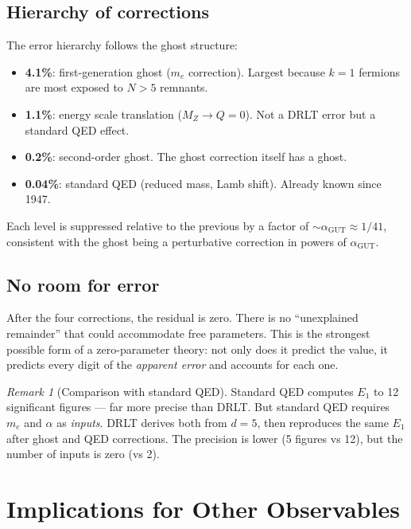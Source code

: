 \documentclass[12pt]{article}
\theoremstyle{remark}
\newtheorem{remark}[theorem]{Remark}
\begin{document}
\subsection{Hierarchy of corrections}

The error hierarchy follows the ghost structure:
\begin{itemize}
\item \textbf{4.1\%}: first-generation ghost ($m_e$ correction). Largest because $k = 1$ fermions are most exposed to $N > 5$ remnants.
\item \textbf{1.1\%}: energy scale translation ($M_Z \to Q = 0$). Not a DRLT error but a standard QED effect.
\item \textbf{0.2\%}: second-order ghost. The ghost correction itself has a ghost.
\item \textbf{0.04\%}: standard QED (reduced mass, Lamb shift). Already known since 1947.
\end{itemize}

Each level is suppressed relative to the previous by a factor of $\sim\!\alpha_\text{GUT} \approx 1/41$, consistent with the ghost being a perturbative correction in powers of $\alpha_\text{GUT}$.

\subsection{No room for error}

After the four corrections, the residual is zero. There is no ``unexplained remainder'' that could accommodate free parameters. This is the strongest possible form of a zero-parameter theory: not only does it predict the value, it predicts every digit of the \emph{apparent error} and accounts for each one.

\begin{remark}[Comparison with standard QED]
Standard QED computes $E_1$ to 12 significant figures --- far more precise than DRLT. But standard QED requires $m_e$ and $\alpha$ as \emph{inputs}. DRLT derives both from $d = 5$, then reproduces the same $E_1$ after ghost and QED corrections. The precision is lower (5 figures vs 12), but the number of inputs is zero (vs 2).
\end{remark}

\section{Implications for Other Observables}
\end{document}

